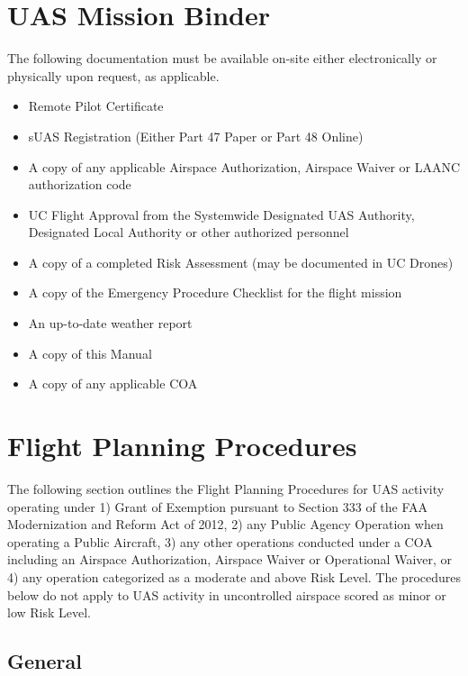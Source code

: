 \documentclass[
]{book}
\providecommand{\tightlist}{%
  \setlength{\itemsep}{0pt}\setlength{\parskip}{0pt}}
\begin{document}
\hypertarget{ch-mission-binder}{%
\chapter{UAS Mission Binder}\label{ch-mission-binder}}

The following documentation must be available on-site either electronically or physically upon request, as applicable.

\begin{itemize}
\tightlist
\item
  Remote Pilot Certificate
\item
  sUAS Registration (Either Part 47 Paper or Part 48 Online)
\item
  A copy of any applicable Airspace Authorization, Airspace Waiver or LAANC authorization code
\item
  UC Flight Approval from the Systemwide Designated UAS Authority, Designated Local Authority or other authorized personnel
\item
  A copy of a completed Risk Assessment (may be documented in UC Drones)
\item
  A copy of the Emergency Procedure Checklist for the flight mission
\item
  An up-to-date weather report
\item
  A copy of this Manual
\item
  A copy of any applicable COA
\end{itemize}

\hypertarget{ch-flight-planning}{%
\chapter{Flight Planning Procedures}\label{ch-flight-planning}}

The following section outlines the Flight Planning Procedures for UAS activity operating under 1) Grant of Exemption pursuant to Section 333 of the FAA Modernization and Reform Act of 2012, 2) any Public Agency Operation when operating a Public Aircraft, 3) any other operations conducted under a COA including an Airspace Authorization, Airspace Waiver or Operational Waiver, or 4) any operation categorized as a moderate and above Risk Level. The procedures below do not apply to UAS activity in uncontrolled airspace scored as minor or low Risk Level.

\hypertarget{general}{%
\section{General}\label{general}}
\end{document}
